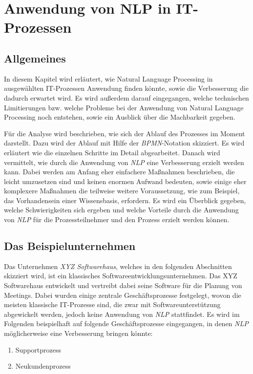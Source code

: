 \chapter{Anwendung von NLP in IT-Prozessen}
\label{cha:ApplicationsForNLPinProcesses}
\section{Allgemeines}

In diesem Kapitel wird erläutert, wie Natural Language Processing in ausgewählten IT-Prozessen Anwendung finden könnte, sowie die Verbesserung die dadurch erwartet wird. Es wird außerdem darauf eingegangen, welche technischen Limitierungen bzw. welche Probleme bei der Anwendung von Natural Language Processing noch entstehen, sowie ein Ausblick über die Machbarkeit gegeben.

Für die Analyse wird beschrieben, wie sich der Ablauf des Prozesses im Moment darstellt. Dazu wird der Ablauf mit Hilfe der \textit{BPMN}-Notation skizziert. Es wird erläutert wie die einzelnen Schritte im Detail abgearbeitet. Danach wird vermittelt, wie durch die Anwendung von \textit{NLP} eine Verbesserung erzielt werden kann. Dabei werden am Anfang eher einfachere Maßnahmen beschrieben, die leicht umzusetzen sind und keinen enormen Aufwand bedeuten, sowie einige eher komplexere Maßnahmen die teilweise weitere Voraussetzung, wie zum Beispiel, das Vorhandensein einer Wissensbasis, erfordern. Es wird ein Überblick gegeben, welche Schwierigkeiten sich ergeben und welche Vorteile durch die Anwendung von \textit{NLP} für die Prozessteilnehmer und den Prozess erzielt werden können.

\section{Das Beispielunternehmen}
Das Unternehmen \textit{XYZ Softwarehaus}, welches in den folgenden Abschnitten skizziert wird, ist ein klassisches Softwareentwicklungsunternehmen. Das XYZ Softwarehaus entwickelt und vertreibt dabei seine Software für die Planung von Meetings. Dabei wurden einige zentrale Geschäftsprozesse festgelegt, wovon die meisten klassische IT-Prozesse sind, die zwar mit Softwareunterstützung abgewickelt werden, jedoch keine Anwendung von \textit{NLP} stattfindet. Es wird im Folgenden beispielhaft auf folgende Geschäftsprozesse eingegangen, in denen \textit{NLP} möglicherweise eine Verbesserung bringen könnte:

\begin{enumerate}
	\item Supportprozess
	\item Neukundenprozess
\end{enumerate}

